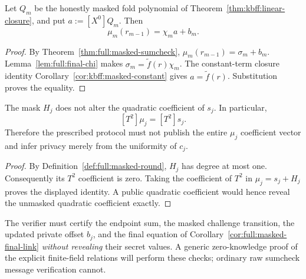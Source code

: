 \begin{corollary}\label{cor:full:masked-final-link}
Let $Q_m$ be the honestly masked
fold polynomial of
Theorem~\ref{thm:kbff:linear-closure},
and put $a:=[X^0]Q_m$. Then
\[
 \boxed{
 \mu_m(r_{m-1})=\chi_m a+b_m.
 }
\]
\end{corollary}
\begin{proof}
By Theorem~\ref{thm:full:masked-sumcheck},
$\mu_m(r_{m-1})=\sigma_m+b_m$.
Lemma~\ref{lem:full:final-chi}
makes $\sigma_m=\widetilde f(r)\chi_m$.
The constant-term closure identity
Corollary~\ref{cor:kbff:masked-constant}
gives $a=\widetilde f(r)$.
Substitution proves the equality.
\end{proof}

\begin{lemma}\label{lem:full:quadratic-leak}
The mask $H_j$ does not alter
the quadratic coefficient of
$s_j$. In particular,
\[
 [T^2]\mu_j=[T^2]s_j.
\]
Therefore the prescribed protocol
must not publish the entire
$\mu_j$ coefficient vector
and infer privacy merely from
the uniformity of $c_j$.
\end{lemma}
\begin{proof}
By Definition~\ref{def:full:masked-round},
$H_j$ has degree at most one.
Consequently its $T^2$
coefficient is zero.
Taking the coefficient of $T^2$
in $\mu_j=s_j+H_j$ proves
the displayed identity.
A public quadratic coefficient
would hence reveal the unmasked
quadratic coefficient exactly.
\end{proof}

\begin{remark}
The verifier must certify the
endpoint sum, the masked challenge
transition, the updated private
offset $b_j$, and the final
equation of
Corollary~\ref{cor:full:masked-final-link}
\emph{without revealing} their
secret values. A generic zero-knowledge
proof of the explicit finite-field
relations will perform these checks;
ordinary raw sumcheck message
verification cannot.
\end{remark}

